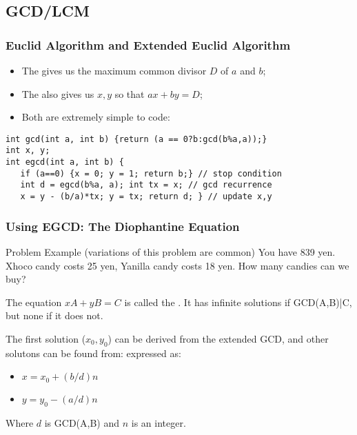 \documentclass{beamer}
\begin{document}
\subsection{GCD/LCM}
\begin{frame}
  \frametitle{Euclid Algorithm and Extended Euclid Algorithm}

  {\smaller  
    \begin{itemize}
    \item The  gives us the maximum common divisor $D$ of $a$ and $b$;
    \item The  also gives us $x,y$ so that $ax+by = D$;
    \item Both are extremely simple to code:
    \end{itemize}
    
    \begin{exampleblock}{}
\begin{verbatim}
int gcd(int a, int b) {return (a == 0?b:gcd(b%a,a));}
int x, y;
int egcd(int a, int b) { 
   if (a==0) {x = 0; y = 1; return b;} // stop condition
   int d = egcd(b%a, a); int tx = x; // gcd recurrence
   x = y - (b/a)*tx; y = tx; return d; } // update x,y
\end{verbatim}
    \end{exampleblock}
}
\end{frame}

\begin{frame}
  \frametitle{Using EGCD: The Diophantine Equation}
  {\smaller
    \begin{block}{Problem Example (variations of this problem are common)}
      You have 839 yen. \alert{X}hoco candy costs 25 yen,
      \alert{Y}anilla candy costs 18 yen. How many candies can we buy?
    \end{block}

    \bigskip

    The equation $xA+yB=C$ is called the . It has infinite solutions if GCD(A,B)|C, but none if
    it does not.

    \bigskip   

    The first solution ($x_0,y_0$) can be derived from the extended
    GCD, and other solutons can be found from:
    expressed as:
    \begin{itemize}
    \item $x = x_0 + (b/d)n$
    \item $y = y_0 - (a/d)n$
    \end{itemize}
    Where $d$ is GCD(A,B) and $n$ is an integer.
  }
\end{frame}
\end{document}
